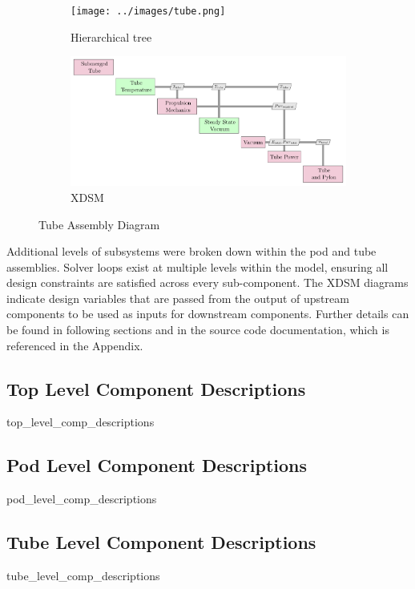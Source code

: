 \begin{figure}
\centering
\begin{subfigure}[t]{.5\textwidth}
  \centering
  \texttt{[image: ../images/tube.png]}
  \caption{Hierarchical tree}
  \label{fig:tree:tube}
\end{subfigure}%
\begin{subfigure}[t]{.5\textwidth}
  \centering
  \includegraphics{../images/xdsm/tube.pdf}
  \caption{XDSM}
  \label{fig:xdsm:tube}
\end{subfigure}
\caption{Tube Assembly Diagram}
\label{fig:tube}
\end{figure}

Additional levels of subsystems were broken down within the pod and tube assemblies.
Solver loops exist at multiple levels within the model, ensuring all design
constraints are satisfied across every sub-component.
The XDSM diagrams indicate design variables that are passed from the output of
upstream components to be used as inputs for downstream components.
Further details can be found in following sections and in the source code
documentation, which is referenced in the Appendix.

\subsection{Top Level Component Descriptions}
	{top_level_comp_descriptions}
\subsection{Pod Level Component Descriptions}
	{pod_level_comp_descriptions}
\subsection{Tube Level Component Descriptions}
	{tube_level_comp_descriptions}



